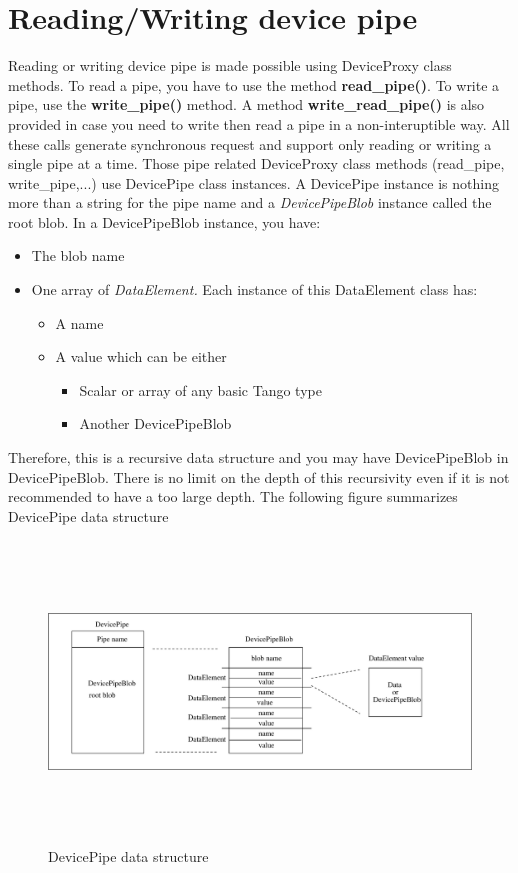 \section{Reading/Writing device pipe}

Reading or writing device pipe is made possible using DeviceProxy
class methods. To read a pipe, you have to use the method \textbf{read\_pipe()}.
To write a pipe, use the \textbf{write\_pipe()} method. A method \textbf{write\_read\_pipe()}
is also provided in case you need to write then read a pipe in a non-interuptible
way. All these calls generate synchronous request and support only
reading or writing a single pipe at a time. Those pipe related DeviceProxy
class methods (read\_pipe, write\_pipe,...) use DevicePipe class instances.
A DevicePipe instance is nothing more than a string
for the pipe name and a \emph{DevicePipeBlob} instance called the
root blob. In a DevicePipeBlob instance, you
have:
\begin{itemize}
\item The blob name
\item One array of \emph{DataElement. }Each instance of this DataElement
class has:

\begin{itemize}
\item A name
\item A value which can be either

\begin{itemize}
\item Scalar or array of any basic Tango type
\item Another DevicePipeBlob
\end{itemize}
\end{itemize}
\end{itemize}
Therefore, this is a recursive data structure and you may have DevicePipeBlob
in DevicePipeBlob. There is no limit on the depth of this recursivity
even if it is not recommended to have a too large depth. The following
figure summarizes DevicePipe data structure
\begin{figure}[H]
\begin{centering}
\includegraphics[width=14cm,height=8cm]{gen_api/pipe}
\par\end{centering}

\protect\caption{DevicePipe data structure\label{ }}
\end{figure}


